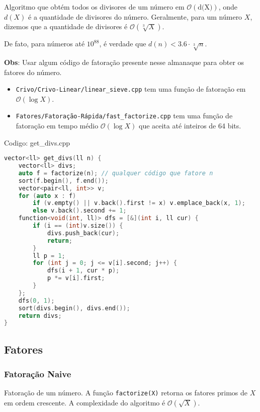 \documentclass[10pt, a4paper, oneside]{book}
\begin{document}
Algoritmo que obtém todos os divisores de um número em $\mathcal{O}(\text{d(X)})$, onde $d(X)$ é a quantidade de divisores do número. Geralmente, para um número $X$, dizemos que a quantidade de divisores é $\mathcal{O}(\sqrt[3]{X})$.



De fato, para números até $10^{88}$, é verdade que $d(n) < 3.6 \cdot \sqrt[3]{n}$.



\textbf{Obs}: Usar algum código de fatoração presente nesse almanaque para obter os fatores do número.

\begin{itemize}
\item \texttt{Crivo/Crivo-Linear/linear\_sieve.cpp} tem uma função de fatoração em $\mathcal{O}(\log X)$.
\item \texttt{Fatores/Fatoração-Rápida/fast\_factorize.cpp} tem uma função de fatoração em tempo médio $\mathcal{O}(\log X)$ que aceita até inteiros de 64 bits.
\end{itemize}

\hfill

Codigo: get\_divs.cpp

\begin{lstlisting}[language=C++]
vector<ll> get_divs(ll n) {
    vector<ll> divs;
    auto f = factorize(n); // qualquer código que fatore n
    sort(f.begin(), f.end());
    vector<pair<ll, int>> v;
    for (auto x : f)
        if (v.empty() || v.back().first != x) v.emplace_back(x, 1);
        else v.back().second += 1;
    function<void(int, ll)> dfs = [&](int i, ll cur) {
        if (i == (int)v.size()) {
            divs.push_back(cur);
            return;
        }
        ll p = 1;
        for (int j = 0; j <= v[i].second; j++) {
            dfs(i + 1, cur * p);
            p *= v[i].first;
        }
    };
    dfs(0, 1);
    sort(divs.begin(), divs.end());
    return divs;
}\end{lstlisting}
\hfill

\subsection{Fatores}
\subsubsection{Fatoração Naive}


Fatoração de um número. A função \texttt{factorize(X)} retorna os fatores primos de $X$ em ordem crescente. A complexidade do algoritmo é $\mathcal{O}(\sqrt{X})$.
\hfill
\end{document}
